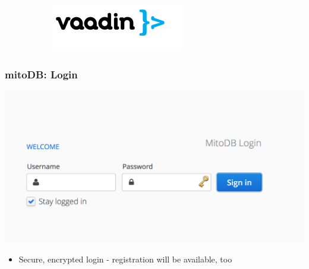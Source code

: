 \documentclass{beamer} %
\begin{document}
\begin{frame}
\begin{figure}
\begin{subfigure}[b]{0.3\textwidth}
    \end{subfigure}
    \qquad
    \begin{subfigure}[b]{0.3\textwidth}
        \includegraphics[width=\textwidth]{imagesBench/vaadin.png}
    \end{subfigure}
\end{figure}
\end{frame}


\begin{frame}
\frametitle{mitoDB: Login}
\centering
	\includegraphics[scale=0.35]{imagesDB/mitodb_login.png}    
\begin{itemize}
\item Secure, encrypted login - registration will be available, too
\end{itemize}
\end{frame}
\end{document}
